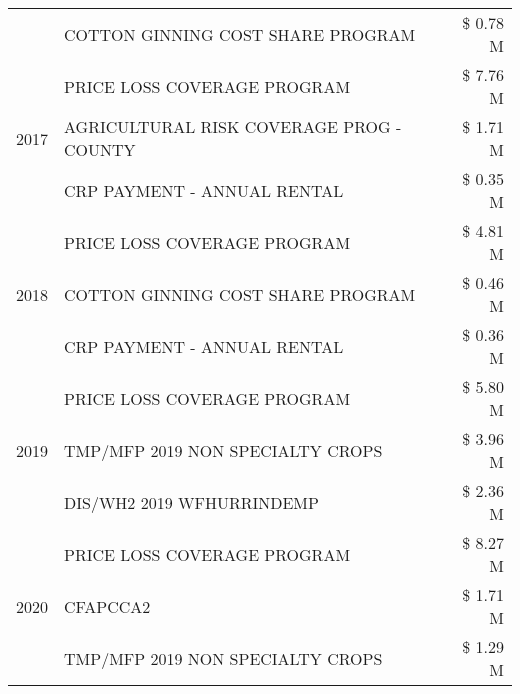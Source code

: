 \begin{tabular}{llr}
 & COTTON GINNING COST SHARE PROGRAM             & \$ 0.78 M \\
\cline{1-3}
\multirow[t]{3}{*}{2017} & PRICE LOSS COVERAGE PROGRAM & \$ 7.76 M \\
 & AGRICULTURAL RISK COVERAGE PROG - COUNTY & \$ 1.71 M \\
 & CRP PAYMENT - ANNUAL RENTAL & \$ 0.35 M \\
\cline{1-3}
\multirow[t]{3}{*}{2018} & PRICE LOSS COVERAGE PROGRAM & \$ 4.81 M \\
 & COTTON GINNING COST SHARE PROGRAM & \$ 0.46 M \\
 & CRP PAYMENT - ANNUAL RENTAL & \$ 0.36 M \\
\cline{1-3}
\multirow[t]{3}{*}{2019} & PRICE LOSS COVERAGE PROGRAM & \$ 5.80 M \\
 & TMP/MFP 2019 NON SPECIALTY CROPS & \$ 3.96 M \\
 & DIS/WH2 2019 WFHURRINDEMP & \$ 2.36 M \\
\cline{1-3}
\multirow[t]{3}{*}{2020} & PRICE LOSS COVERAGE PROGRAM & \$ 8.27 M \\
 & CFAPCCA2 & \$ 1.71 M \\
 & TMP/MFP 2019 NON SPECIALTY CROPS & \$ 1.29 M \\
\cline{1-3}
\bottomrule
\end{tabular}

